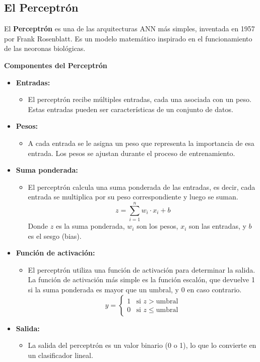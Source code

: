 \documentclass[12pt]{article}
\begin{document}
  \subsection{El Perceptrón}
  El \textbf{Perceptrón}   es una de las arquitecturas ANN más simples, inventada en 1957 por Frank Rosenblatt. 
  Es un modelo matemático inspirado en el funcionamiento de las neoronas biológicas.
  
  \textbf{Componentes del Perceptrón}

  \begin{itemize}
      \item \textbf{Entradas:}
      \begin{itemize}
          \item El perceptrón recibe múltiples entradas, cada una asociada con un peso. Estas entradas pueden ser características de un conjunto de datos.
      \end{itemize}
      
      \item \textbf{Pesos:}
      \begin{itemize}
          \item A cada entrada se le asigna un peso que representa la importancia de esa entrada. Los pesos se ajustan durante el proceso de entrenamiento.
      \end{itemize}
      
      \item \textbf{Suma ponderada:}
      \begin{itemize}
          \item El perceptrón calcula una suma ponderada de las entradas, es decir, cada entrada se multiplica por su peso correspondiente y luego se suman.
          \[
          z = \sum_{i=1}^{n} w_i \cdot x_i + b
          \]
          Donde \( z \) es la suma ponderada, \( w_i \) son los pesos, \( x_i \) son las entradas, y \( b \) es el sesgo (bias).
      \end{itemize}
    
    \item \textbf{Función de activación:}
    \begin{itemize}
        \item El perceptrón utiliza una función de activación para determinar la salida. La función de activación más 
        simple es la función escalón, que devuelve 1 si la suma ponderada es mayor que un umbral, y 0 en caso contrario.
        \[
        y = 
        \begin{cases} 
        1 & \text{si } z > \text{umbral} \\
        0 & \text{si } z \leq \text{umbral}
        \end{cases}
        \]
    \end{itemize}
    
    \item \textbf{Salida:}
    \begin{itemize}
        \item La salida del perceptrón es un valor binario (0 o 1), lo que lo convierte en un clasificador lineal.
    \end{itemize}
\end{itemize}
\end{document}
